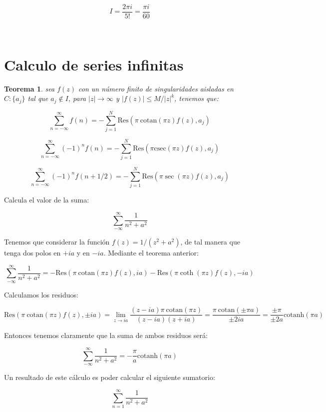 \documentclass[12pt,a4paper]{book}
\newcommand{\cotanh}{\mathrm{cotanh}}
\newcommand{\cotan}{\ \mathrm{cotan}}
\newcommand{\Res}{\mathrm{Res}}
\newtheorem{theorem}{Teorema}[section]
\begin{document}
$$ I = \frac{2 \pi i}{5 !} = \dfrac{\pi i}{60} $$


\hrulefill \\

\section{Calculo de series infinitas}

\begin{theorem}
sea $f(z)$ con un número finito de singularidades aisladas en $C:\{ a_j \}$ tal que $a_j \notin I$, para $|z| \longrightarrow \infty$ y $|f(z)| \leq M/|z|^k$, tenemos que:

$$ \sum_{n=-\infty}^\infty f(n) = - \sum_{j=1}^N \Res (\pi \cotan (\pi z) f(z), a_j ) $$

$$ \sum_{n=-\infty}^\infty (-1)^n f(n) = - \sum_{j=1}^N \Res (\pi \mathrm{csec} (\pi z) f(z), a_j )$$

$$ \sum_{n=-\infty }^{\infty} (-1)^n f(n+1/2) = - \sum_{j=1}^N \Res (\pi \sec (\pi z) f(z), a_j) $$

\end{theorem}




\hrulefill

Calcula el valor de la suma:

$$ \sum_{-\infty}^{\infty} \dfrac{1}{n^2+a^2} $$

Tenemos que considerar la función $f(z) = 1/(z^2+a^2)$, de tal manera que tenga dos polos en $+ia$ y en $-ia$. Mediante el teorema anterior:

 
$$ \sum_{-\infty}^{\infty} \dfrac{1}{n^2+a^2} = - \Res (\pi \cotan(\pi z) f(z), ia)  - \Res (\pi \coth(\pi z) f(z), -ia)    $$

Calculamos los residuos:

$$   \Res (\pi \cotan(\pi z) f(z), \pm ia) = \lim_{z \rightarrow ia} \dfrac{(z-ia) \pi \cotan(\pi z)}{(z-ia)(z+ia)} = \dfrac{ \pi \cotan (\pm \pi a)}{\pm 2ia} = \dfrac{\pm \pi}{\pm 2a} \cotanh ( \pi a)   $$

Entonces tenemos claramente que la suma de ambos residuos será:


$$ \sum_{-\infty}^{\infty} \dfrac{1}{n^2+a^2} = - \frac{\pi}{a} \cotanh(\pi a)$$

Un resultado de este cálculo es poder calcular el siguiente sumatorio:

$$ \sum_{n=1}^\infty  \dfrac{1}{n^2+a^2}$$
\end{document}
